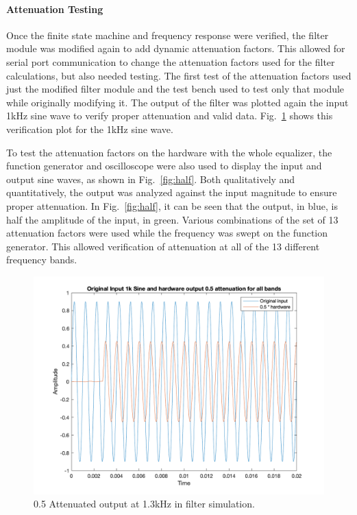 \documentclass[journal]{IEEEtran} %
\begin{document}
\paragraph{Attenuation Testing} Once the finite state machine and frequency response were verified, the filter module was modified again to add dynamic attenuation factors. This allowed for serial port communication to change the attenuation factors used for the filter calculations, but also needed testing. The first test of the attenuation factors used just the modified filter module and the test bench used to test only that module while originally modifying it. The output of the filter was plotted again the input 1kHz sine wave to verify proper attenuation and valid data. Fig.~\ref{fig:half_sim} shows this verification plot for the 1kHz sine wave. 

To test the attenuation factors on the hardware with the whole equalizer, the function generator and oscilloscope were also used to display the input and output sine waves, as shown in Fig.~\ref{fig:half}. Both qualitatively and quantitatively, the output was analyzed against the input magnitude to ensure proper attenuation. In Fig.~\ref{fig:half}, it can be seen that the output, in blue, is half the amplitude of the input, in green. Various combinations of the set of 13 attenuation factors were used while the frequency was swept on the function generator. This allowed verification of attenuation at all of the 13 different frequency bands.

\begin{figure}[htbp]
\centering
\includegraphics[width=0.9\linewidth]{Figures/EQ/output_atten.png}
\caption{\label{fig:half_sim}0.5 Attenuated output at 1.3kHz in filter simulation.}
\end{figure}
\end{document}

